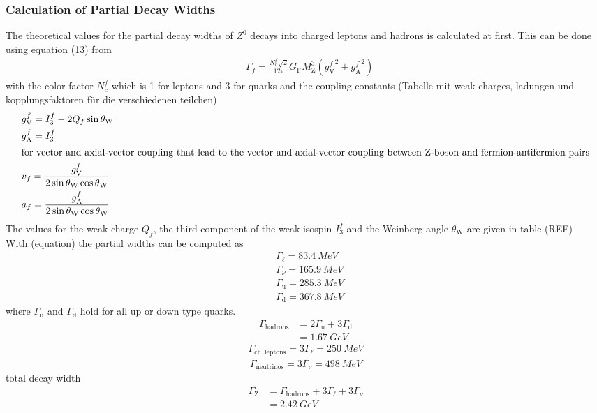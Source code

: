 \documentclass[11pt, a4paper]{article}
\numberwithin{equation}{section}
\newcommand{\korr}[1]{{\color{red}(#1)}}
\begin{document}
\subsubsection{Calculation of Partial Decay Widths}
The theoretical values for the partial decay widths of $Z^0$ decays into charged leptons and hadrons is calculated at first.
This can be done using equation (13) from \cite{instructions}
\begin{align*}
	&\Gamma_f = \frac{N_\mathrm{c}^f \sqrt{2}}{12 \pi} G_\mathrm{F} M_\mathrm{Z}^3 \left( {g_\mathrm{V}^f}^2 + {g_\mathrm{A}^f}^2 \right)
\end{align*}
with the color factor $N_c^f$ which is 1 for leptons and 3 for quarks and the coupling constants
\korr{Tabelle mit weak charges, ladungen und kopplungsfaktoren für die verschiedenen teilchen}
\cite{instructions}
\begin{align*}
	&g_\mathrm{V}^f = I_3^f - 2 Q_f \sin\theta_\mathrm{W}\\
	&g_\mathrm{A}^f = I_3^f \\
	\intertext{for vector and axial-vector coupling that lead to the vector and axial-vector coupling between Z-boson and fermion-antifermion pairs}
	&v_f = \frac{g_\mathrm{V}^f}{2\sin\theta_\mathrm{W}\cos\theta_\mathrm{W}}\\
	&a_f = \frac{g_\mathrm{A}^f}{2\sin\theta_\mathrm{W}\cos\theta_\mathrm{W}}
\end{align*}
The values for the weak charge $Q_f$, the third component of the weak isospin $I_3^f$ and the Weinberg angle $\theta_\mathrm{W}$ are given in table \korr{REF}\\
With \korr{equation} the partial widths can be computed as
\begin{align*}
	&\Gamma_\ell = \SI{83.4}{MeV} \\
	&\Gamma_\nu = \SI{165.9}{MeV} \\
	&\Gamma_\mathrm{u} = \SI{285.3}{MeV} \\
	&\Gamma_\mathrm{d} = \SI{367.8}{MeV}
\end{align*}
where $\Gamma_\mathrm{u}$ and $\Gamma_\mathrm{d}$ hold for all up or down type quarks.
\begin{align*}
\Gamma_\mathrm{hadrons} &= 2\Gamma_\mathrm{u} + 3\Gamma_\mathrm{d} \\
&= \SI{1.67}{GeV}
\end{align*}
\begin{align*}
	\Gamma_\mathrm{ch.~leptons} = 3\Gamma_\ell = \SI{250}{MeV}
\end{align*}
\begin{align*}
	\Gamma_\mathrm{neutrinos} = 3\Gamma_\nu =\SI{498}{MeV}
\end{align*}
total decay width
\begin{align*}
	\Gamma_\mathrm{Z} &= \Gamma_\mathrm{hadrons} + 3 \Gamma_\ell + 3\Gamma_\nu \\
	&= \SI{2.42}{GeV}
\end{align*}
\end{document}
